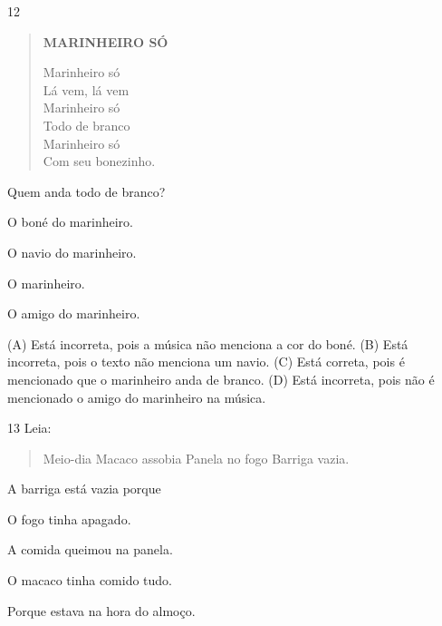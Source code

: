 \num{12}

\begin{verse}
\textbf{MARINHEIRO SÓ}

Marinheiro só\\
Lá vem, lá vem\\
Marinheiro só\\
Todo de branco\\
Marinheiro só\\
Com seu bonezinho.

\end{verse}


Quem anda todo de branco?

\begin{escolha}
\item O boné do marinheiro.

\item O navio do marinheiro.

\item O marinheiro.

\item O amigo do marinheiro.
\end{escolha}


(A) Está incorreta, pois a música não menciona a cor do boné.
(B) Está incorreta, pois o texto não menciona um navio.
(C) Está correta, pois é mencionado que o marinheiro anda de branco.
(D) Está incorreta, pois não é mencionado o amigo do marinheiro na música.

\num{13} Leia:

\begin{verse}
Meio-dia
Macaco assobia
Panela no fogo
Barriga vazia.
\end{verse}


A barriga está vazia porque

\begin{escolha}
\item O fogo tinha apagado.

\item A comida queimou na panela.

\item O macaco tinha comido tudo.

\item Porque estava na hora do almoço.
\end{escolha}


